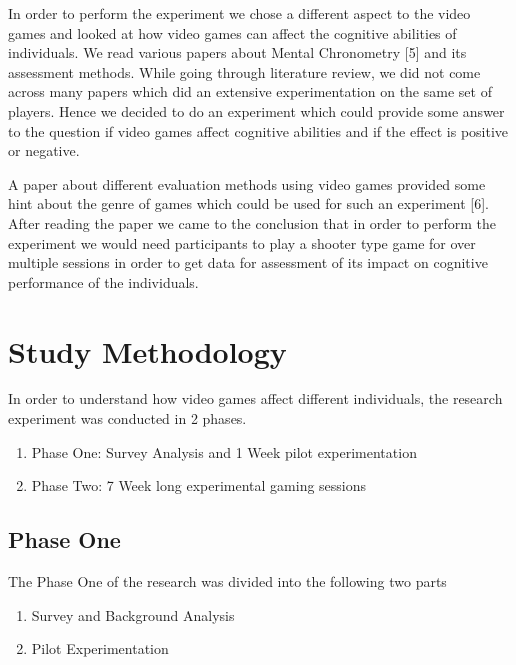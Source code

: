 \documentclass[conference]{IEEEtran}
\begin{document}
\newline
\newline
\begin{flushleft}
    
In order to perform the experiment we chose a different aspect to the video games and looked at how video games can affect the cognitive abilities of individuals. We read various papers about Mental Chronometry [5] and its assessment methods. While going through literature review, we did not come across many papers which did an extensive experimentation on the same set of players. Hence we decided to do an experiment which could provide some answer to the question if video games affect cognitive abilities and if the effect is positive or negative.
\end{flushleft}
\newline
\newline
A paper about different evaluation methods using video games provided some hint about the genre of games which could be used for such an experiment [6]. After reading the paper we came to the conclusion that in order to perform the experiment we would need participants to play a shooter type game for over multiple sessions in order to get data for assessment of its impact on cognitive performance of the individuals.

\section{Study Methodology}
In order to understand how video games affect different individuals, the research experiment was conducted in 2 phases. 
\begin{enumerate}
    \item Phase One: Survey Analysis and 1 Week pilot experimentation
    \item Phase Two: 7 Week long experimental gaming sessions
\end{enumerate}
\subsection{Phase One}
The Phase One of the research was divided into the following two parts
\begin{enumerate}
    \item Survey and Background Analysis
    \item Pilot Experimentation
\end{enumerate}
\end{document}
